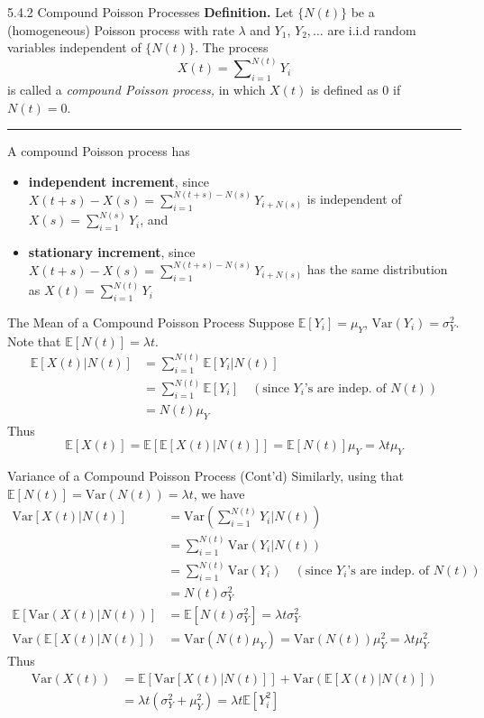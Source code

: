 \documentclass[letterpaper,handout, mathserif]{beamer}
\def\Sum{\sum\nolimits}
\def\E{\mathbb E}
\def\V{\mathrm{Var}}
\begin{document}
\begin{frame}{5.4.2 Compound Poisson Processes}
\mbox{}{\bf Definition.} Let $\{N(t)\}$ be a (homogeneous) Poisson process with rate $\lambda$ and $Y_1$, $Y_2,\ldots$ are i.i.d random variables independent of $\{N(t)\}$. The process
$$X(t)=\Sum_{i=1}^{N(t)}Y_i$$
is called a {\em compound Poisson process,} in which $X(t)$ is defined as 0 if $N(t)=0$.

\medskip\hrule\medskip

A compound Poisson process has
\begin{itemize}
\item {\bf independent increment}, since $X(t+s)-X(s)=\sum_{i=1}^{N(t+s)-N(s)}Y_{i+N(s)}$ is independent of $X(s)=\Sum_{i=1}^{N(s)}Y_i$, and
\item {\bf stationary increment}, since $X(t+s)-X(s)=\sum_{i=1}^{N(t+s)-N(s)}Y_{i+N(s)}$ has the same distribution as
$X(t)=\Sum_{i=1}^{N(t)}Y_i$
\end{itemize}
\end{frame}
\begin{frame}{The Mean of a Compound Poisson Process}
Suppose $\E[Y_i]=\mu_Y$, $\V(Y_i)=\sigma^2_Y$. Note that $\E[N(t)]=\lambda t$.
\begin{align*}
\E[X(t)|N(t)]&=\Sum_{i=1}^{N(t)}\E[Y_i|N(t)]\\
&=\Sum_{i=1}^{N(t)}\E[Y_i]\quad (\mbox{since } Y_i\mbox{'s are indep. of }N(t))\\
&=N(t)\mu_Y
\end{align*}
Thus
$$
\E[X(t)]=\E[\E[X(t)|N(t)]]=\E[N(t)]\mu_Y=\lambda t\mu_Y
$$
\end{frame}
\begin{frame}{Variance of a Compound Poisson Process (Cont'd)}
Similarly, using that $\E[N(t)]=\V(N(t))=\lambda t$, we have
\begin{align*}
\V[X(t)|N(t)]&=\V\left(\Sum_{i=1}^{N(t)}Y_i\Big|N(t)\right)\\
&=\Sum_{i=1}^{N(t)}\V(Y_i|N(t))\\
&=\Sum_{i=1}^{N(t)}\V(Y_i)\quad (\mbox{since } Y_i\mbox{'s are indep. of }N(t))\\
&=N(t)\sigma^2_Y\\
\E[\V(X(t)|N(t))]&=\E[N(t)\sigma^2_Y]=\lambda t\sigma^2_Y\\
\V(\E[X(t)|N(t)])&=\V(N(t)\mu_Y)=\V(N(t))\mu^2_Y=\lambda t\mu^2_Y
\end{align*}
Thus
\begin{align*}
\V(X(t))&=\E[\V[X(t)|N(t)]]+\V(\E[X(t)|N(t)])\\
&=\lambda t(\sigma^2_Y+\mu^2_Y)=\lambda t\E[Y_i^2]
\end{align*}
\end{frame}
\end{document}
